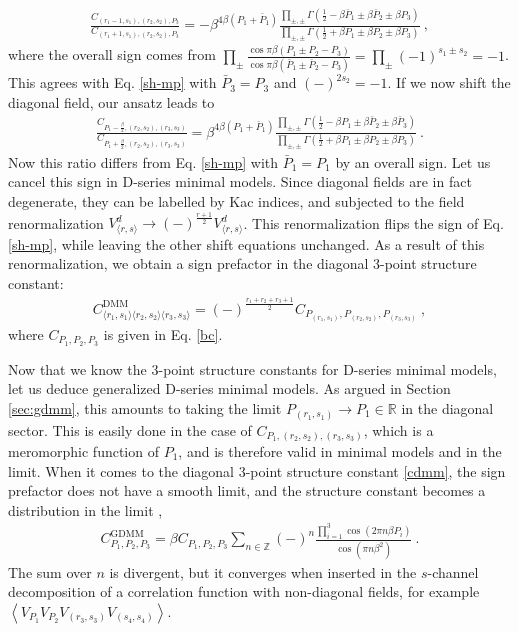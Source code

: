 \documentclass[12pt, a4paper]{article}
\theoremstyle{break}
\begin{document}
\begin{align}
 \frac{C_{(r_1-1,s_1),(r_2,s_2),P_3}}{C_{(r_1+1,s_1),(r_2,s_2),P_3}} = - \beta^{4\beta(P_1+\bar P_1)}\frac{\prod_{\pm,\pm} \Gamma(\frac12-\beta \bar P_1\pm \beta\bar P_2\pm \beta P_3)}{\prod_{\pm,\pm} \Gamma(\frac12+\beta P_1\pm \beta P_2\pm \beta P_3)}\ , 
\end{align}
where the overall sign comes from $\prod_\pm \frac{\cos \pi\beta(P_1\pm P_2-P_3)}{\cos\pi\beta(\bar P_1\pm \bar P_2-P_3)} = \prod_\pm (-1)^{s_1\pm s_2} = -1$. This agrees with Eq. \eqref{sh-mp} with $\bar P_3=P_3$ and $(-)^{2s_2}=-1$. If we now shift the diagonal field, our ansatz leads to 
\begin{align}
 \frac{C_{P_1-\frac{\beta}{2},(r_2,s_2),(r_3,s_3)}}{C_{P_1+\frac{\beta}{2},(r_2,s_2),(r_3,s_3)}} =\beta^{4\beta(P_1+\bar P_1)}\frac{\prod_{\pm,\pm} \Gamma(\frac12-\beta P_1\pm \beta\bar P_2\pm \beta \bar P_3)}{\prod_{\pm,\pm} \Gamma(\frac12+\beta P_1\pm \beta P_2\pm \beta P_3)}\ .
\end{align}
Now this ratio differs from Eq. \eqref{sh-mp} with $\bar P_1=P_1$ by an overall sign. Let us cancel this sign in D-series minimal models. Since diagonal fields are in fact degenerate, they can be labelled by Kac indices, and subjected to the field renormalization 
$V^d_{\langle r,s\rangle}\to (-)^{\frac{r+1}{2}} V^d_{\langle r,s\rangle}$. 
This renormalization flips the sign of Eq. \eqref{sh-mp}, while leaving the other shift equations unchanged. As a result of this renormalization, we obtain a sign prefactor in the diagonal 3-point structure constant:
\begin{align}
 \boxed{C^\text{DMM}_{\langle r_1,s_1\rangle\langle r_2,s_2\rangle\langle r_3,s_3\rangle} = (-)^\frac{r_1+r_2+r_3+1}{2} C_{P_{(r_1,s_1)},P_{(r_2,s_2)},P_{(r_3,s_3)}}}\ , 
 \label{cdmm}
\end{align}
where $C_{P_1,P_2,P_3}$ is given in Eq. \eqref{bc}.

Now that we know the 3-point structure constants for D-series minimal models, let us deduce generalized D-series minimal models. As argued in Section \ref{sec:gdmm}, this amounts to taking the limit $P_{(r_1,s_1)}\to P_1\in\mathbb{R}$ in the diagonal sector. This is easily done in the case of $C_{P_1,(r_2,s_2),(r_3,s_3)}$, which is a meromorphic function of $P_1$, and is therefore valid in minimal models and in the limit. When it comes to the diagonal 3-point structure constant \eqref{cdmm}, the sign prefactor does not have a smooth limit, and the structure constant becomes a distribution in the limit \cite{rib19},
\begin{align}
 \boxed{C^\text{GDMM}_{P_1,P_2,P_3} = \beta C_{P_1,P_2,P_3}\sum_{n\in\mathbb{Z}}(-)^n \frac{\prod_{i=1}^3 \cos(2\pi n\beta P_i)}{\cos(\pi n\beta^2)}}\ .
 \label{cgdmm}
\end{align}
The sum over $n$ is divergent, but it converges when inserted in the $s$-channel decomposition of a correlation function with non-diagonal fields, for example $\left<V_{P_1}V_{P_2}V_{(r_3,s_3)}V_{(s_4,s_4)}\right>$. 
\end{document}
